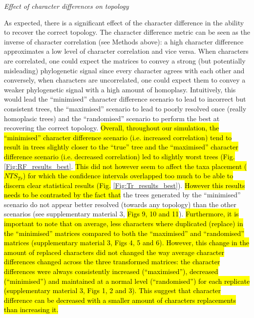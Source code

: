 \documentclass[12pt,letterpaper]{article}
\renewcommand{\subsection}[1]{%
\bigskip
\begin{center}
\begin{large}
\normalfont\itshape #1
\end{large}
\end{center}}
\begin{document}
\subsection{Effect of character differences on topology}
As expected, there is a significant effect of the character difference in the ability to recover the correct topology.
The character difference metric can be seen as the inverse of character correlation (see Methods above): a high character difference approximates a low level of character correlation and vice versa.
When characters are correlated, one could expect the matrices to convey a strong (but potentially misleading) phylogenetic signal since every character agrees with each other and conversely, when characters are uncorrelated, one could expect them to convey a weaker phylogenetic signal with a high amount of homoplasy.
Intuitively, this would lead the ``minimised'' character difference scenario to lead to incorrect but consistent trees, the ``maximised'' scenario to lead to poorly resolved once (really homoplasic trees) and the ``randomised'' scenario to perform the best at recovering the correct topology.
\hl{Overall, throughout our simulation, the ``minimised'' character difference scenario (i.e. increased correlation) tend to result in trees slightly closer to the ``true'' tree and the ``maximised'' character difference scenario (i.e. decreased correlation) led to slightly worst trees (Fig.}
\ref{Fig:RF_results_best}.
\hl{This did not however seem to affect the taxa placement ($NTS_{Tr}$) for which the confidence intervals overlapped too much to be able to discern clear statistical results (Fig.}
\ref{Fig:Tr_results_best}).
\hl{However this results needs to be contrasted by the fact that}
the trees generated by the ``minimised'' scenario do not appear better resolved (towards any topology) than the other scenarios (see supplementary material 3, \hl{Figs 9, 10 and 11}).
\hl{Furthermore, it is important to note that on average, less characters where duplicated (replace) in the ``minimised'' matrices compared to both the ``maximised'' and ``randomised'' matrices (supplementary material 3, Figs 4, 5 and 6).
However, this change in the amount of replaced characters did not changed the way average character differences changed across the three transformed matrices: the character differences were always consistently increased (``maximised''), decreased (``minimised'') and maintained at a normal level (``randomised'') for each replicate (supplementary material 3, Figs 1, 2 and 3).
This suggest that character difference can be decreased with a smaller amount of characters replacements than increasing it.}
\end{document}
